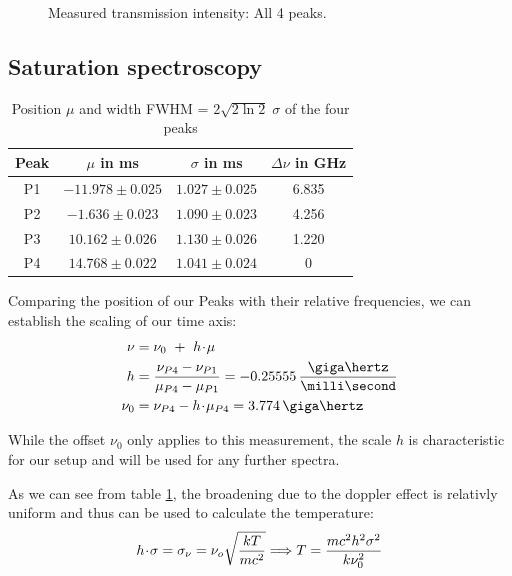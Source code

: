 \begin{figure}[p]
	\centering
	
	\vspace{-1ex}
	\caption{Measured transmission intensity: All 4 peaks.}
	\label{fig:absorption}
	\vspace{-2em}
\end{figure}


\subsection{Saturation spectroscopy}


\begin{table}[h]
 \centering
 \caption{Position $\mu$ and width FWHM = $2 \sqrt{2 \ln 2} \; \sigma$ of the four peaks}
 \label{tab:raw}
 \begin{tabular}{cccc}
  \toprule
  Peak	& $\mu$ in ms 		& $\sigma$ in ms 		& $\Delta \nu$ in GHz	\\
  \midrule
  P1	& $-11.978 \pm 0.025$	& $1.027 \pm 0.025$ 	& 6.835		\\
  P2	& $-1.636 \pm 0.023$	& $1.090 \pm 0.023$ 	& 4.256		\\
  P3	& $10.162 \pm 0.026$	& $1.130 \pm 0.026$ 	& 1.220		\\
  P4	& $14.768 \pm 0.022$	& $1.041 \pm 0.024$ 	& 0			\\
  \bottomrule
 \end{tabular}
\end{table}

Comparing the position of our Peaks with their relative frequencies, we can establish the scaling of our time axis:
\begin{align}
	\nu   &= \nu_0 ~+~ h \cdt \mu \\
	 h    &= \frac{\nu_{P4} - \nu_{P1}}{\mu_{P4} - \mu_{P1}} = -0.25555 \,\frac{\giga\hertz}{\milli\second}\\
	\nu_0 &= \nu_{P4} - h \cdt \mu_{P4}  = 3.774 \,\giga\hertz
\end{align}

While the offset $\nu_0$ only applies to this measurement, the scale $h$ is characteristic for our setup and will be used for any further spectra.

As we can see from table \ref{tab:raw}, the broadening due to the doppler effect is relativly uniform and thus can be used to calculate the temperature:
\begin{equation}
 h \!\cdot\! \sigma = \sigma_\nu = \nu_o \sqrt{\frac{k T}{m c^2}} \Longrightarrow T = \frac{m c^2 h^2 \sigma^2}{k\nu_0^2}
\end{equation}


